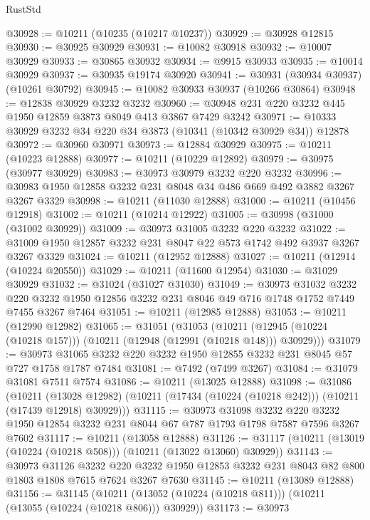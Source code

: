 \begin{lexlean}{RustStd}
\begin{coremodule}
{\begin{coremodule}
{{{{{{{{{{{{{{{{{{{{{{{{{@30928 := @10211 (@10235 (@10217 @10237))
@30929 := @30928 @12815
@30930 := @30925 @30929
@30931 := @10082 @30918
@30932 := @10007 @30929
@30933 := @30865 @30932
@30934 := @9915 @30933
@30935 := @10014 @30929
@30937 := @30935 @19174 @30920
@30941 := @30931 (@30934 @30937) (@10261 @30792)
@30945 := @10082 @30933 @30937 (@10266 @30864)
@30948 := @12838 @30929 @3232 @3232
@30960 := @30948 @231 @220 @3232 @445 @1950 @12859 @3873 @8049 @413 @3867 @7429 @3242
@30971 := @10333 @30929 @3232 @34 @220 @34 @3873 (@10341 (@10342 @30929 @34)) @12878
@30972 := @30960 @30971
@30973 := @12884 @30929
@30975 := @10211 (@10223 @12888)
@30977 := @10211 (@10229 @12892)
@30979 := @30975 (@30977 @30929)
@30983 := @30973 @30979 @3232 @220 @3232
@30996 := @30983 @1950 @12858 @3232 @231 @8048 @34 @486 @669 @492 @3882 @3267 @3267 @3329
@30998 := @10211 (@11030 @12888)
@31000 := @10211 (@10456 @12918)
@31002 := @10211 (@10214 @12922)
@31005 := @30998 (@31000 (@31002 @30929))
@31009 := @30973 @31005 @3232 @220 @3232
@31022 := @31009 @1950 @12857 @3232 @231 @8047 @22 @573 @1742 @492 @3937 @3267 @3267 @3329
@31024 := @10211 (@12952 @12888)
@31027 := @10211 (@12914 (@10224 @20550))
@31029 := @10211 (@11600 @12954)
@31030 := @31029 @30929
@31032 := @31024 (@31027 @31030)
@31049 := @30973
    @31032
    @3232
    @220
    @3232
    @1950
    @12856
    @3232
    @231
    @8046
    @49
    @716
    @1748
    @1752
    @7449
    @7455
    @3267
    @7464
@31051 := @10211 (@12985 @12888)
@31053 := @10211 (@12990 @12982)
@31065 := @31051
    (@31053
      (@10211 (@12945 (@10224 (@10218 @157))) (@10211 (@12948 (@12991 (@10218 @148))) @30929)))
@31079 := @30973 @31065 @3232 @220 @3232 @1950 @12855 @3232 @231 @8045 @57 @727 @1758 @1787 @7484
@31081 := @7492 (@7499 @3267)
@31084 := @31079 @31081 @7511 @7574
@31086 := @10211 (@13025 @12888)
@31098 := @31086
    (@10211
      (@13028 @12982)
      (@10211 (@17434 (@10224 (@10218 @242))) (@10211 (@17439 @12918) @30929)))
@31115 := @30973
    @31098
    @3232
    @220
    @3232
    @1950
    @12854
    @3232
    @231
    @8044
    @67
    @787
    @1793
    @1798
    @7587
    @7596
    @3267
    @7602
@31117 := @10211 (@13058 @12888)
@31126 := @31117 (@10211 (@13019 (@10224 (@10218 @508))) (@10211 (@13022 @13060) @30929))
@31143 := @30973
    @31126
    @3232
    @220
    @3232
    @1950
    @12853
    @3232
    @231
    @8043
    @82
    @800
    @1803
    @1808
    @7615
    @7624
    @3267
    @7630
@31145 := @10211 (@13089 @12888)
@31156 := @31145
    (@10211 (@13052 (@10224 (@10218 @811))) (@10211 (@13055 (@10224 (@10218 @806))) @30929))
@31173 := @30973
}}}}}}}}}}}}}}}}}}}}}}}}}
\end{coremodule}}
\end{coremodule}
\end{lexlean}

